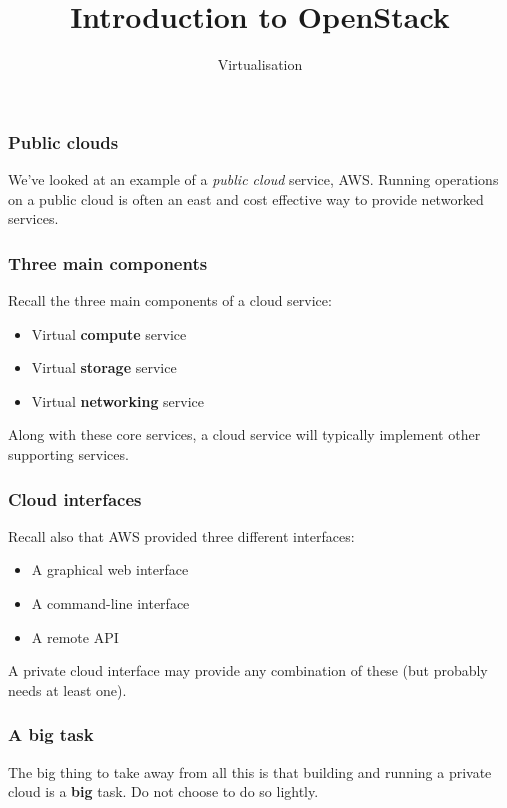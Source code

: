 \documentclass[10pt]{beamer}
\title{Introduction to OpenStack}
\author[I720]{Virtualisation}
\institute[Otago Polytechnic]{
  Otago Polytechnic \\
  Dunedin, New Zealand \\
}
\date{}
\begin{document}
\begin{frame}[plain]
  \titlepage
\end{frame}

\begin{frame}
  \frametitle{Public clouds}
  
  We've looked at an example of a \emph{public cloud} service, AWS. Running operations on a public cloud is often an east and cost effective way to provide networked services.
  
  \end{frame}

\begin{frame}
  \frametitle{Three main components}
  
  Recall the three main components of a cloud service:
  
  \begin{itemize}
  \item Virtual \textbf{compute} service
  \item Virtual \textbf{storage} service
  \item Virtual \textbf{networking} service
  \end{itemize}
  
  Along with these core services, a cloud service will typically implement other supporting services.
  
\end{frame}

\begin{frame}
  \frametitle{Cloud interfaces}
  
  Recall also that AWS provided three different interfaces:
  
  \begin{itemize}
   \item A graphical web interface
   \item A command-line interface
   \item A remote API
   \end{itemize}
   
   A private cloud interface may provide any combination of these (but probably needs at least one).
\end{frame}

\begin{frame}
  \frametitle{A big task}
  
  The big thing to take away from all this is that building and running a private cloud is a \textbf{big} task. Do not choose to do so lightly.
  \end{frame}
  
\end{document}
